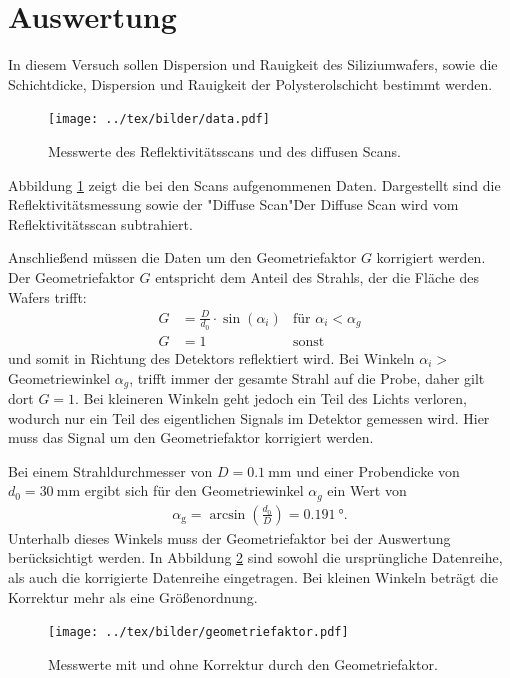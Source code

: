 \section{Auswertung}
In diesem Versuch sollen Dispersion und Rauigkeit des Siliziumwafers, sowie die Schichtdicke, Dispersion und Rauigkeit der Polysterolschicht bestimmt werden.

\begin{figure}[h]
	\centering
	\texttt{[image: ../tex/bilder/data.pdf]}
	\caption{Messwerte des Reflektivitätsscans und des diffusen Scans.}
	\label{pic:daten}
\end{figure}

Abbildung \ref{pic:daten} zeigt die bei den Scans aufgenommenen Daten. Dargestellt sind die Reflektivitätsmessung sowie der "Diffuse Scan"\. Der Diffuse Scan wird vom Reflektivitätsscan subtrahiert.

Anschließend müssen die Daten um den Geometriefaktor $G$ korrigiert werden.
Der Geometriefaktor $G$ entspricht dem Anteil des Strahls, der die Fläche des Wafers trifft:
\begin{align}
	G &= \frac{D}{d_0}\cdot \sin(\alpha_i) &\text{für $\alpha_i < \alpha_g$}\\
	G &= 1 &\text{sonst}
\end{align}
 und somit in Richtung des Detektors reflektiert wird. Bei Winkeln $\alpha_i >$ Geometriewinkel $\alpha_g$, trifft immer der gesamte Strahl auf die Probe, daher gilt dort $G=1$. Bei kleineren Winkeln geht jedoch ein Teil des Lichts verloren, wodurch nur ein Teil des eigentlichen Signals im Detektor gemessen wird. Hier muss das Signal um den Geometriefaktor korrigiert werden.

Bei einem Strahldurchmesser von $D = \SI{0.1}{\milli\meter}$ und einer Probendicke von $d_0 = \SI{30}{\milli\meter}$ ergibt sich für den Geometriewinkel $\alpha_g$ ein Wert von
\begin{align}
	\alpha_\text{g} = \arcsin\left(\frac{d_0}{D}\right) = \SI{0.191}{\degree}.
\end{align}
Unterhalb dieses Winkels muss der Geometriefaktor bei der Auswertung berücksichtigt werden. In Abbildung \ref{pic:geometrie} sind sowohl die ursprüngliche Datenreihe, als auch die korrigierte Datenreihe eingetragen. Bei kleinen Winkeln beträgt die Korrektur mehr als eine Größenordnung.

\begin{figure}[h]
	\centering
	\texttt{[image: ../tex/bilder/geometriefaktor.pdf]}
	\caption{Messwerte mit und ohne Korrektur durch den Geometriefaktor.}
	\label{pic:geometrie}
\end{figure}


